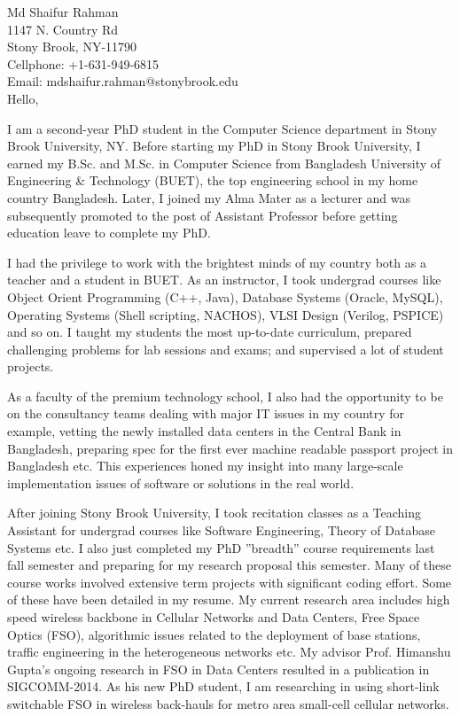 \documentclass[letterpaper, 11pt]{article}
\begin{document}
\pagestyle{empty}
\noindent Md Shaifur Rahman\\
1147 N. Country Rd\\
Stony Brook, NY-11790\\
Cellphone: +1-631-949-6815\\
Email: mdshaifur.rahman@stonybrook.edu\\

\noindent Hello,

I am a second-year PhD student in the Computer
Science department in Stony Brook University, NY. 
Before starting my PhD in Stony Brook University, I earned my B.Sc. and M.Sc. in Computer 
Science from Bangladesh 
University of Engineering & Technology (BUET), the top engineering school in my home 
country Bangladesh. Later, I joined my Alma Mater as a lecturer and was subsequently 
promoted to the post of Assistant Professor before getting education leave to complete
 my PhD. 

 
 I had the privilege to work with the brightest minds of my country both as a
  teacher and a student in BUET. As an instructor, I took undergrad courses like Object
   Orient Programming (C++, Java), Database Systems (Oracle, MySQL), Operating Systems 
   (Shell scripting, NACHOS), VLSI Design (Verilog,
   PSPICE) and so on.
   I taught my students the most up-to-date curriculum, prepared challenging problems for
    lab sessions and exams; and
     supervised a lot of student projects. 
       
       
       As a faculty of the
       premium technology school, I also had the opportunity to be on the consultancy 
       teams dealing with major IT issues in my country for example, vetting the newly 
       installed data centers in the Central Bank in Bangladesh, preparing spec for the 
       first ever machine readable passport project in Bangladesh etc. This experiences 
       honed my insight into many 
       large-scale implementation issues of software or solutions in the real world. 
       
       
After joining Stony Brook University, I took recitation classes as a
Teaching Assistant for undergrad courses like Software Engineering, Theory of
Database Systems etc.
 I also just completed my PhD ''breadth'' course requirements last fall
semester and preparing for my research proposal this semester. Many of these course works 
involved extensive term projects with significant coding effort. Some of these have 
been detailed in my resume.
My current research area includes high speed wireless backbone in Cellular Networks 
and Data Centers, Free Space Optics (FSO), algorithmic issues related to the
deployment of base stations, traffic engineering in the heterogeneous networks
etc. My advisor Prof. Himanshu Gupta's ongoing research in FSO
in Data Centers resulted in a publication in SIGCOMM-2014. As his new PhD student, 
I am researching in using short-link
switchable FSO in wireless back-hauls for metro area small-cell cellular
networks.
\end{document}

